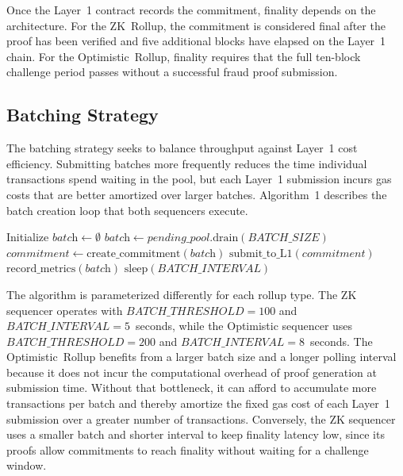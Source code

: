 \documentclass[
]{elteikthesis}[2024/04/26]
\begin{document}
Once the Layer~1 contract records the commitment, finality depends on the architecture. For the ZK~Rollup, the commitment is considered final after the proof has been verified and five additional blocks have elapsed on the Layer~1 chain. For the Optimistic~Rollup, finality requires that the full ten-block challenge period passes without a successful fraud proof submission.

\subsection{Batching Strategy}

The batching strategy seeks to balance throughput against Layer~1 cost efficiency. Submitting batches more frequently reduces the time individual transactions spend waiting in the pool, but each Layer~1 submission incurs gas costs that are better amortized over larger batches. Algorithm~1 describes the batch creation loop that both sequencers execute.

\begin{algorithm}
    \caption{Batch Creation Loop}
    \begin{algorithmic}
        \STATE Initialize $\textit{batch} \leftarrow \emptyset$
        \LOOP
                \STATE $\textit{batch} \leftarrow \textit{pending\_pool}.\text{drain}(\textit{BATCH\_SIZE})$
                \STATE $\textit{commitment} \leftarrow \text{create\_commitment}(\textit{batch})$
                \STATE $\text{submit\_to\_L1}(\textit{commitment})$
                \STATE $\text{record\_metrics}(\textit{batch})$
            \ENDIF
            \STATE $\text{sleep}(\textit{BATCH\_INTERVAL})$
        \ENDLOOP
    \end{algorithmic}
\end{algorithm}

The algorithm is parameterized differently for each rollup type. The ZK sequencer operates with $\textit{BATCH\_THRESHOLD} = 100$ and $\textit{BATCH\_INTERVAL} = 5$~seconds, while the Optimistic sequencer uses $\textit{BATCH\_THRESHOLD} = 200$ and $\textit{BATCH\_INTERVAL} = 8$~seconds. The Optimistic~Rollup benefits from a larger batch size and a longer polling interval because it does not incur the computational overhead of proof generation at submission time. Without that bottleneck, it can afford to accumulate more transactions per batch and thereby amortize the fixed gas cost of each Layer~1 submission over a greater number of transactions. Conversely, the ZK sequencer uses a smaller batch and shorter interval to keep finality latency low, since its proofs allow commitments to reach finality without waiting for a challenge window.
\end{document}
